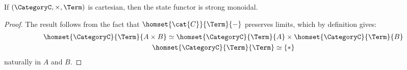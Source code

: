     \begingroup
    \def\theproposition{\ref{prop: state functor strong}}
    \begin{proposition}
        If $(\CategoryC, \times, \Term)$ is cartesian, then the state functor is strong monoidal.
    \end{proposition}
    \addtocounter{proposition}{-1}
    \endgroup
    \begin{proof}
        The result follows from the fact that $\homset{\cat{C}}{\Term}{-}$ preserves limits, which by definition gives:
        \begin{gather*}
            \homset{\CategoryC}{\Term}{A \times B} \simeq \homset{\CategoryC}{\Term}{A} \times \homset{\CategoryC}{\Term}{B}\\
            \homset{\CategoryC}{\Term}{\Term} \simeq \{*\}
        \end{gather*}
        naturally in $A$ and $B$.
    \end{proof}















 

%
%





